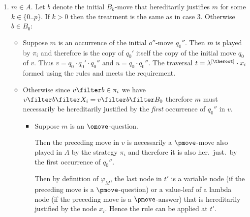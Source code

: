 \begin{itemize}[$\bullet$]
\begin{description}
\begin{enumerate}[1.]
            \item $m \in A$. Let $b$ denote the initial $B_k$-move that hereditarily justifies $m$ for some $k \in\{0..p\}$.
                  If $k>0$ then the treatment is the same as in case 3. Otherwise $b \in B_0$:

                   \begin{itemize}
                     \item Suppose $m$ is an occurrence of the initial $o''$-move $q_0''$. Then $m$ is played by $\pi_i$ and therefore is the copy of $q_0'$ itself the copy of the initial move $q_0$ of $v$. Thus $v = q_0 \cdot q_0' \cdot q_0''$ and $u = q_0 \cdot q_0''$. The traversal $t = \lambda^{[\theroot]} \cdot x_i$ formed using the rules  and  meets the requirement.

                   \item Otherwise since $v \filter b \in \pi_i$ we have $ v \filter b \filter X_i = v \filter b \filter B_0$ therefore $m$ must necessarily be hereditarily justified by the \emph{first} occurrence of $q_0''$ in $v$.

                       \begin{itemize}
                         \item Suppose $m$ is an $\omove$-question.

                       Then the preceding move in $v$ is necessarily a $\pmove$-move also played in $A$ by the strategy $\pi_i$ and therefore it is also her.\ just.\ by the first occurrence of $q_0''$.

                       Then by definition of $\varphi_M$, the last node in  $t'$ is a variable node (if the preceding move is a $\pmove$-question) or a value-leaf of a lambda node (if the preceding move is a $\pmove$-answer) that is hereditarily justified by the node $x_i$. Hence the  rule  can be applied at $t'$.


\end{itemize}
\end{itemize}
\end{enumerate}
\end{description}
\end{itemize}
